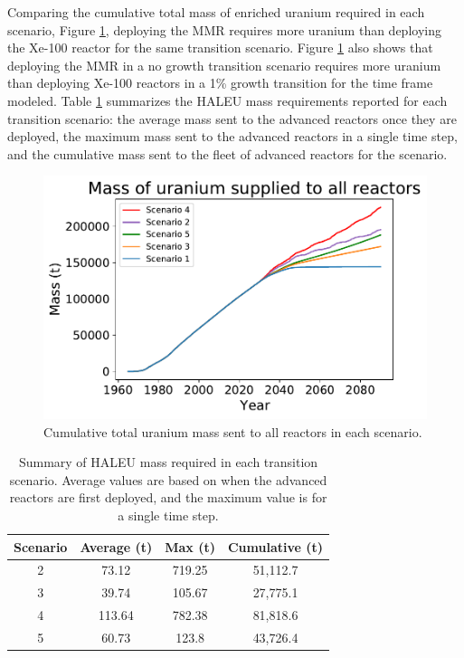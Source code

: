 Comparing the cumulative total mass of enriched uranium required in each scenario, 
Figure \ref{fig:cumulativeU_all}, deploying the \gls{MMR} 
requires more uranium than deploying the Xe-100 reactor for the same 
transition scenario. Figure \ref{fig:cumulativeU_all} also shows that 
deploying the \gls{MMR} in a no growth transition 
scenario requires more uranium than deploying Xe-100 reactors in a 1\% 
growth transition for the time frame modeled. Table \ref{tab:U_summary} summarizes 
the \gls{HALEU} mass 
requirements reported for each transition scenario: the average mass sent to 
the advanced reactors once they are deployed, the maximum mass sent to the 
advanced reactors in a single time step, and the cumulative mass sent to the 
fleet of advanced reactors for the scenario. 

\begin{figure}
    \centering 
    \includegraphics[scale=0.4]{../figures/fuelsupplytotal_scenarios_all.pdf}
    \caption{Cumulative total uranium mass sent to all reactors in each scenario.}
    \label{fig:cumulativeU_all}
\end{figure}


\begin{table}
    \centering
    \caption{Summary of \gls{HALEU} mass required in each transition scenario. Average values are
    based on when the advanced reactors are first deployed, and the maximum value is for a single time 
    step.}
    \label{tab:U_summary}
    \begin{tabular}{c c c c}
        \hline
        Scenario & Average (t) & Max (t) & Cumulative (t) \\\hline
        2 & 73.12 & 719.25 & 51,112.7 \\
        3 & 39.74 & 105.67 & 27,775.1 \\
        4 & 113.64 & 782.38 & 81,818.6 \\
        5 & 60.73 & 123.8 & 43,726.4 
        \\\hline       
    \end{tabular}
\end{table}

